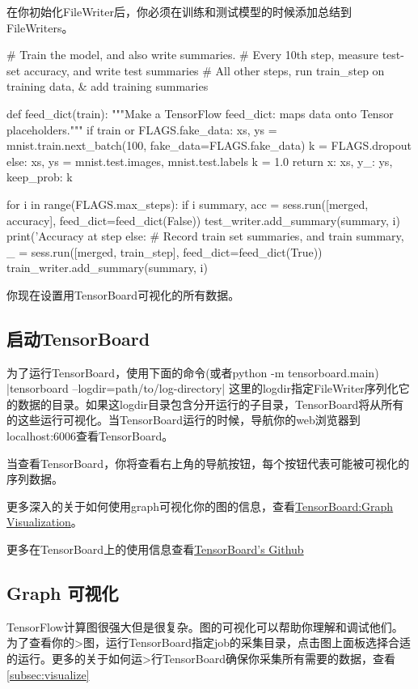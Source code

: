  在你初始化FileWriter后，你必须在训练和测试模型的时候添加总结到FileWriters。
 \begin{pythoncode}
 # Train the model, and also write summaries.
 # Every 10th step, measure test-set accuracy, and write test summaries
 # All other steps, run train_step on training data, & add training summaries
 
 def feed_dict(train):
   """Make a TensorFlow feed_dict: maps data onto Tensor placeholders."""
   if train or FLAGS.fake_data:
     xs, ys = mnist.train.next_batch(100, fake_data=FLAGS.fake_data)
     k = FLAGS.dropout
   else:
     xs, ys = mnist.test.images, mnist.test.labels
     k = 1.0
   return {x: xs, y_: ys, keep_prob: k}
 
 for i in range(FLAGS.max_steps):
   if i %
     summary, acc = sess.run([merged, accuracy], feed_dict=feed_dict(False))
     test_writer.add_summary(summary, i)
     print('Accuracy at step %
   else:  # Record train set summaries, and train
     summary, _ = sess.run([merged, train_step], feed_dict=feed_dict(True))
     train_writer.add_summary(summary, i)
 \end{pythoncode}
 你现在设置用TensorBoard可视化的所有数据。
 \subsection{启动TensorBoard}
 为了运行TensorBoard，使用下面的命令(或者python -m tensorboard.main)
 |tensorboard --logdir=path/to/log-directory|
 这里的logdir指定FileWriter序列化它的数据的目录。如果这logdir目录包含分开运行的子目录，TensorBoard将从所有的这些运行可视化。当TensorBoard运行的时候，导航你的web浏览器到localhost:6006查看TensorBoard。
 
 当查看TensorBoard，你将查看右上角的导航按钮，每个按钮代表可能被可视化的序列数据。
 
 更多深入的关于如何使用graph可视化你的图的信息，查看\href{https://www.tensorflow.org/programmers_guide/graph_viz}{TensorBoard:Graph Visualization}。
 
 更多在TensorBoard上的使用信息查看\href{https://github.com/tensorflow/tensorboard}{TensorBoard's Github}
\subsection{Graph 可视化} 
TensorFlow计算图很强大但是很复杂。图的可视化可以帮助你理解和调试他们。为了查看你的>图，运行TensorBoard指定job的采集目录，点击图上面板选择合适的运行。更多的关于如何运>行TensorBoard确保你采集所有需要的数据，查看\ref{subsec:visualize}
